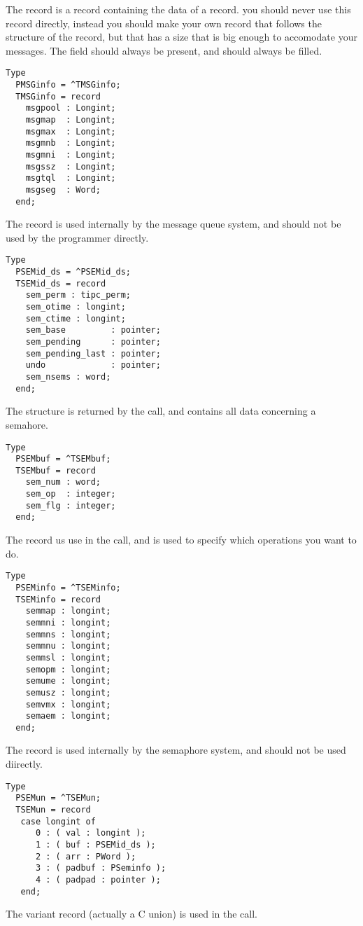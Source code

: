 The  record is a record containing the data of a record. you
should never use this record directly, instead you should make your own
record that follows the structure of the  record, but that has
a size that is big enough to accomodate your messages. The  field
should always be present, and should always be filled.
\begin{verbatim}
Type
  PMSGinfo = ^TMSGinfo;
  TMSGinfo = record
    msgpool : Longint;
    msgmap  : Longint;
    msgmax  : Longint;
    msgmnb  : Longint;
    msgmni  : Longint;
    msgssz  : Longint;
    msgtql  : Longint;
    msgseg  : Word;
  end;
\end{verbatim}
The   record is used internally by the message queue system,
and should not be used by the programmer directly.
\begin{verbatim}
Type
  PSEMid_ds = ^PSEMid_ds;
  TSEMid_ds = record
    sem_perm : tipc_perm;
    sem_otime : longint;
    sem_ctime : longint;
    sem_base         : pointer;
    sem_pending      : pointer;
    sem_pending_last : pointer;
    undo             : pointer;
    sem_nsems : word;
  end;
\end{verbatim}
The  structure is returned by the  call, and
contains all data concerning a semahore.
\begin{verbatim}
Type
  PSEMbuf = ^TSEMbuf;
  TSEMbuf = record
    sem_num : word;
    sem_op  : integer;
    sem_flg : integer;
  end;
\end{verbatim}
The  record us use in the  call, and is used to
specify which operations you want to do.
\begin{verbatim}
Type
  PSEMinfo = ^TSEMinfo;
  TSEMinfo = record
    semmap : longint;
    semmni : longint;
    semmns : longint;
    semmnu : longint;
    semmsl : longint;
    semopm : longint;
    semume : longint;
    semusz : longint;
    semvmx : longint;
    semaem : longint;
  end;
\end{verbatim}
The  record is used internally by the semaphore system, and
should not be used diirectly.
\begin{verbatim}
Type
  PSEMun = ^TSEMun;
  TSEMun = record
   case longint of
      0 : ( val : longint );
      1 : ( buf : PSEMid_ds );
      2 : ( arr : PWord );
      3 : ( padbuf : PSeminfo );
      4 : ( padpad : pointer );
   end;
\end{verbatim}
The  variant record (actually a C union) is used in the
 call.
 
